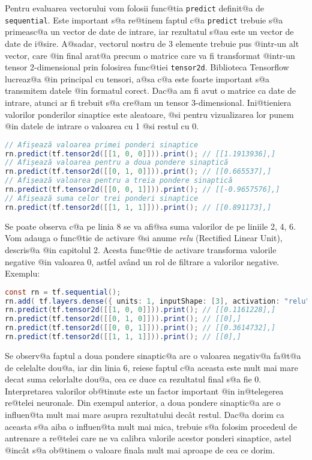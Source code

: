 Pentru evaluarea vectorului vom folosii func@tia \texttt{predict} definit@a de \texttt{sequential}. Este important s@a re@tinem faptul c@a \texttt{predict} trebuie s@a primeasc@a un vector de date de intrare, iar rezultatul s@au este un vector de date de i@sire. A@sadar, vectorul nostru de 3 elemente trebuie pus @intr-un alt vector, care @in final arat@a precum o matrice care va fi transformat @intr-un tensor 2-dimensional prin folosirea func@tiei \texttt{tensor2d}. Biblioteca Tensorflow lucreaz@a @in principal cu tensori, a@sa c@a este foarte important s@a transmitem datele @in formatul corect. Dac@a am fi avut o matrice ca date de intrare, atunci ar fi trebuit s@a cre@am un tensor 3-dimensional.
Ini@tieniera valorilor ponderilor sinaptice este aleatoare, @si pentru vizualizarea lor punem @in datele de intrare o valoarea cu 1 @si restul cu 0.

\begin{lstlisting}[language=Java, caption={Exemplu de evaluare a unei simple re@tele neuronale}]
// Afișează valoarea primei ponderi sinaptice
rn.predict(tf.tensor2d([[1, 0, 0]])).print(); // [[1.1913936],]
// Afișează valoarea pentru a doua pondere sinaptică
rn.predict(tf.tensor2d([[0, 1, 0]])).print(); // [[0.665537],]
// Afișează valoarea pentru a treia pondere sinaptică
rn.predict(tf.tensor2d([[0, 0, 1]])).print(); // [[-0.9657576],]
// Afișează suma celor trei ponderi sinaptice 
rn.predict(tf.tensor2d([[1, 1, 1]])).print(); // [[0.891173],]
\end{lstlisting}

Se poate observa c@a pe linia 8 se va afi@sa suma valorilor de pe liniile 2, 4, 6. Vom adauga o func@tie de activare @si anume \textit{relu} (Rectified Linear Unit), descris@a @in capitolul 2. Acesta func@tie de activare transforma valorile negative @in valoarea 0, astfel av\^ and un rol de filtrare a valorilor negative. Exemplu:

\begin{lstlisting}[language=Java, caption={Exemplu de evaluare a unei simple rețele neuronale cu funcție de activare}]
const rn = tf.sequential();
rn.add( tf.layers.dense({ units: 1, inputShape: [3], activation: "relu", useBias: false }) );
rn.predict(tf.tensor2d([[1, 0, 0]])).print(); // [[0.1161228],] 
rn.predict(tf.tensor2d([[0, 1, 0]])).print(); // [[0],]
rn.predict(tf.tensor2d([[0, 0, 1]])).print(); // [[0.3614732],]
rn.predict(tf.tensor2d([[1, 1, 1]])).print(); // [[0],]
\end{lstlisting}

Se observ@a faptul a doua pondere sinaptic@a are o valoarea negativ@a fa@t@a de celelalte dou@a, iar din linia 6, reiese faptul c@a aceasta este mult mai mare decat suma celorlalte dou@a, cea ce duce ca rezultatul final s@a fie 0. Interpretarea valorilor ob@tinute este un factor important @in in@telegerea re@telei neuronale. Din exempul anterior, a doua pondere sinaptic@a are o influen@ta mult mai mare asupra rezultatului dec\^ at restul. Dac@a dorim ca aceasta s@a aiba o influen@ta mult mai mica, trebuie s@a folosim procedeul de antrenare a re@telei care ne va calibra valorile acestor ponderi sinaptice, astel @inc\^ at s@a ob@tinem o valoare finala mult mai aproape de cea ce dorim.

